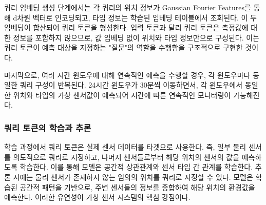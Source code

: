 \documentclass[final,5p,times,twocolumn,authoryear]{elsarticle}
\begin{document}
쿼리 임베딩 생성 단계에서는 각 쿼리의 위치 정보가 Gaussian Fourier Features를 통해 d차원 벡터로 인코딩되고, 타입 정보는 학습된 임베딩 테이블에서 조회된다. 이 두 임베딩이 합산되어 쿼리 토큰을 형성한다. 입력 토큰과 달리 쿼리 토큰은 측정값에 대한 정보를 포함하지 않으므로, 값 임베딩 없이 위치와 타입 정보만으로 구성된다. 이는 쿼리 토큰이 예측 대상을 지정하는 "질문"의 역할을 수행함을 구조적으로 구현한 것이다.

마지막으로, 여러 시간 윈도우에 대해 연속적인 예측을 수행할 경우, 각 윈도우마다 동일한 쿼리 구성이 반복된다. 24시간 윈도우가 30분씩 이동하면서, 각 윈도우에서 동일한 위치와 타입의 가상 센서값이 예측되어 시간에 따른 연속적인 모니터링이 가능해진다.


\subsubsection{쿼리 토큰의 학습과 추론}
학습 과정에서 쿼리 토큰은 실제 센서 데이터를 타겟으로 사용한다. 즉, 일부 물리 센서를 의도적으로 쿼리로 지정하고, 나머지 센서들로부터 해당 위치의 센서의 값을 예측하도록 학습한다. 이를 통해 모델은 공간적 상관관계와 센서 타입 간 관계를 학습한다.
추론 시에는 물리 센서가 존재하지 않는 임의의 위치를 쿼리로 지정할 수 있다. 모델은 학습된 공간적 패턴을 기반으로, 주변 센서들의 정보를 종합하여 해당 위치의 환경값을 예측한다. 이러한 유연성이 가상 센서 시스템의 핵심 강점이다.
\end{document}
